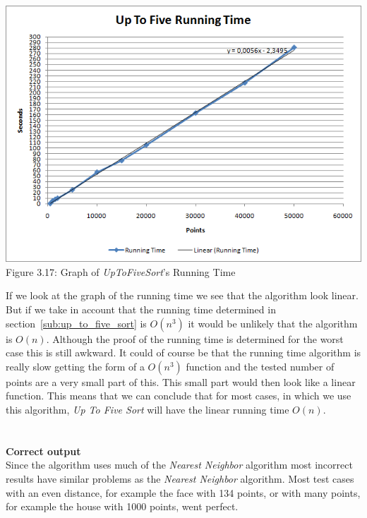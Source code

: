          \begin{center}
            \includegraphics[scale = 0.5]{4UpToFiveSort/utfsRuntimeGraph.png}\\
            Figure 3.17: Graph of \textit{UpToFiveSort}'s Running Time
            \label{fig:utfs runningtime}
          \end{center}

      \noindent If we look at the graph of the running time we see that the algorithm look linear. But if we take in account that the running time determined in section~\ref{sub:up_to_five_sort} is $O(n^3)$ it would be unlikely that the algorithm is $O(n)$. Although the proof of the running time is determined for the worst case this is still awkward. It could of course be that the running time algorithm is really slow getting the form of a $O(n^3)$ function and the tested number of points are a very small part of this. This small part would then look like a linear function. This means that we can conclude that for most cases, in which we use this algorithm, \textit{Up To Five Sort} will have the linear running time $O(n)$.\\\\\\
    \textbf{Correct output}\\
    Since the algorithm uses much of the \textit{Nearest Neighbor} algorithm most incorrect results have similar problems as the \textit{Nearest Neighbor} algorithm.
    Most test cases with an even distance, for example the face with 134 points, or with many points, for example the house with 1000 points, went perfect.

